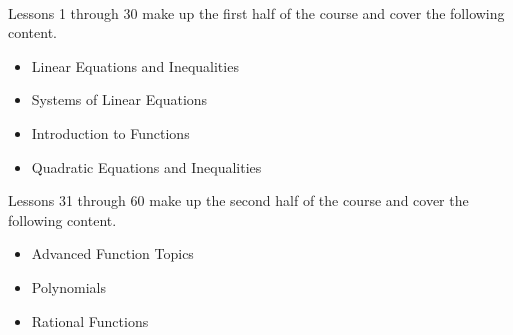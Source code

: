 \documentclass[12pt]{article}
\theoremstyle{definition}
\begin{document}
\par
\hrulefill
\par
\ \par
Lessons 1 through 30 make up the first half of the course and cover the following content.
\begin{itemize}
	\item Linear Equations and Inequalities
	\item Systems of Linear Equations
	\item Introduction to Functions
	\item Quadratic Equations and Inequalities
\end{itemize}
Lessons 31 through 60 make up the second half of the course and cover the following content.
\begin{itemize}
	\item Advanced Function Topics
	\item Polynomials
	\item Rational Functions
\end{itemize}
\newpage
\end{document}
